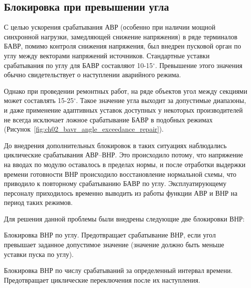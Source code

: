 \subsection{Блокировка при превышении угла}
\label{sec:ch02_vnr_blocking_angle_exceedance}

С целью ускорения срабатывания АВР (особенно при наличии мощной синхронной нагрузки,
замедляющей снижение напряжения) в ряде терминалов БАВР, помимо контроля снижения
напряжения, был внедрен пусковой орган по углу между векторами напряжений источников.
Стандартные уставки срабатывания по углу для БАВР составляют 10-15$^\circ$. Превышение
этого значения обычно свидетельствует о наступлении аварийного режима.\par\vspace{0.2cm}

Однако при проведении ремонтных работ, на ряде объектов угол между секциями может
составлять 15-25$^\circ$. Такое значение угла выходит за допустимые диапазоны, и даже
применение адаптивных уставок доступных у некоторых производителей
\cite{bavr_bib_043_rukovodstvo_2024} не всегда исключает ложное срабатывание БАВР в
подобных режимах
(Рисунок~\ref{fig:ch02_bavr_angle_exceedance_repair}).\par\vspace{0.2cm}

До внедрения дополнительных блокировок в таких ситуациях наблюдались циклические
срабатывания АВР--ВНР. Это происходило потому, что напряжение на вводах по модулю
оставалось в пределах нормы, и после отработки выдержки времени готовности ВНР
происходило восстановление нормальной схемы, что приводило к повторному срабатыванию
БАВР по углу. Эксплуатирующему персоналу приходилось временно выводить из работы функции
АВР и ВНР на период таких режимов.\par\vspace{0.2cm}

Для решения данной проблемы были внедрены следующие две блокировки ВНР:\par\vspace{0.2cm}

Блокировка ВНР по углу. Предотвращает срабатывание ВНР, если угол превышает заданное
допустимое значение (значение должно быть меньше уставки пуска по
углу).\par\vspace{0.2cm}

Блокировка ВНР по числу срабатываний за определенный интервал времени. Предотвращает
циклические переключения после их наступления.\par\vspace{0.2cm}

